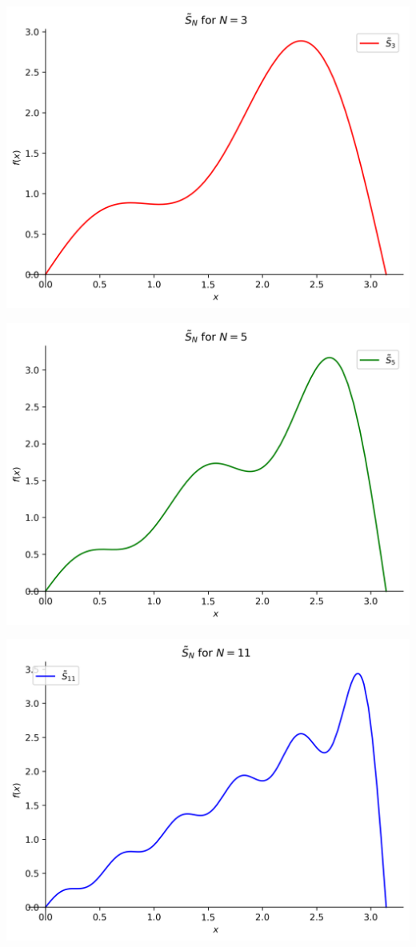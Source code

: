 \documentclass{exam}
\begin{document}
\begin{questions}
\begin{parts}
\begin{solution}
    \centering
    \includegraphics[scale=0.67]{5ds3.png}

    \centering
    \includegraphics[scale=0.67]{5ds5.png}

    \centering
    \includegraphics[scale=0.67]{5ds11.png}

\end{solution}
\end{parts}
\end{questions}
\end{document}
